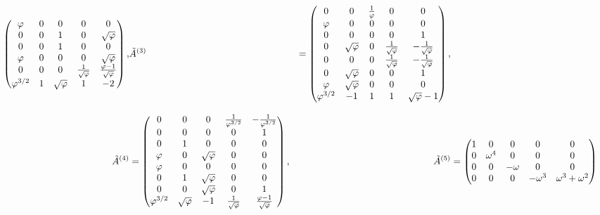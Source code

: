 \begin{align}
\begin{pmatrix}
    \varphi & 0 & 0 & 0 & 0 \\
    0 & 0 & 1 & 0 & \sqrt{\varphi} \\
    0 & 0 & 1 & 0 & 0 \\
    \varphi & 0 & 0 & 0 & \sqrt{\varphi} \\
    0 & 0 & 0 & \frac{1}{\sqrt{\varphi}} & \frac{\varphi-1}{\sqrt{\varphi}} \\
    \varphi^{3/2} & 1 & \sqrt{\varphi} & 1 & -2 \\
  \end{pmatrix}, &
  \tilde{A}^{(3)} &= \begin{pmatrix}
    0 & 0 & \frac{1}{\varphi} & 0 & 0 \\
    \varphi & 0 & 0 & 0 & 0 \\
    0 & 0 & 0 & 0 & 1 \\
    0 & \sqrt{\varphi} & 0 & \frac{1}{\sqrt{\varphi}} & -\frac{1}{\sqrt{\varphi}} \\
    0 & 0 & 0 & \frac{1}{\sqrt{\varphi}} & -\frac{1}{\sqrt{\varphi}} \\
    0 & \sqrt{\varphi} & 0 & 0 & 1 \\
    \varphi & \sqrt{\varphi} & 0 & 0 & 0 \\
    \varphi^{3/2} & -1 & 1 & 1 & \sqrt{\varphi}-1 \\
  \end{pmatrix}, \notag \\[2ex]
  \tilde{A}^{(4)} &= \begin{pmatrix}
    0 & 0 & 0 & \frac{1}{\varphi^{3/2}} & -\frac{1}{\varphi^{3/2}} \\
    0 & 0 & 0 & 0 & 1 \\
    0 & 1 & 0 & 0 & 0 \\
    \varphi & 0 & \sqrt{\varphi} & 0 & 0 \\
    \varphi & 0 & 0 & 0 & 0 \\
    0 & 1 & \sqrt{\varphi} & 0 & 0 \\
    0 & 0 & \sqrt{\varphi} & 0 & 1 \\
    \varphi^{3/2} & \sqrt{\varphi} & -1 & \frac{1}{\sqrt{\varphi}} & \frac{\varphi-1}{\sqrt{\varphi}} \\
  \end{pmatrix}, &
  \tilde{A}^{(5)} &= \begin{pmatrix}
    1 & 0 & 0 & 0 & 0 \\
    0 & \omega^4 & 0 & 0 & 0 \\
    0 & 0 & -\omega & 0 & 0 \\
    0 & 0 & 0 & -\omega^3 & \omega^3+\omega^2 \\

\end{pmatrix}
\end{align}
